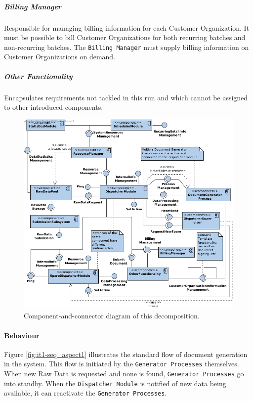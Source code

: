 \documentclass[a4paper,10pt]{article}
\begin{document}
\subparagraph{Billing Manager}
Responsible for managing billing information for each Customer Organization. It must be possible to bill Customer Organizations for both recurring batches and non-recurring batches. The \texttt{Billing Manager} must supply billing information on Customer Organizations on demand.

\subparagraph{Other Functionality}
Encapsulates requirements not tackled in this run and which cannot be
assigned to other introduced components.

\begin{figure}[!htp]
    \centering
    \includegraphics[width=\textwidth]{comp_diag_1.png}
    \caption{Component-and-connector diagram of this decomposition.}\label{fig:it1-cc_main}
\end{figure}

\paragraph{Behaviour}
Figure \ref{fig:it1-seq_aspect1} illustrates the standard flow of document generation in the system. This flow is initiated by the \texttt{Generator Processes} themselves. When new Raw Data is requested and none is found, \texttt{Generator Processes} go into standby. When the \texttt{Dispatcher Module} is notified of new data being available, it can reactivate the \texttt{Generator Processes}.
\end{document}
